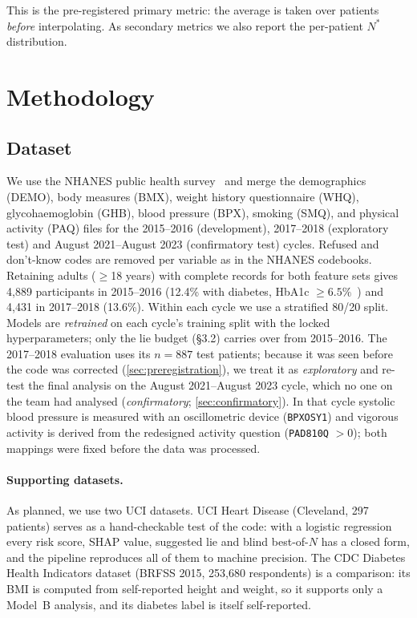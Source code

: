 \documentclass[sigconf,nonacm]{acmart}
\begin{document}
This is the pre-registered primary metric: the average is taken over
patients \emph{before} interpolating.  As secondary metrics we also
report the per-patient $N^*$ distribution.

\section{Methodology}

\subsection{Dataset}

We use the NHANES public health survey~\cite{johnson2014national} and
merge the demographics (DEMO), body measures (BMX), weight history
questionnaire (WHQ), glycohaemoglobin (GHB), blood pressure (BPX),
smoking (SMQ), and physical activity (PAQ) files for the 2015--2016
(development), 2017--2018 (exploratory test) and August
2021--August 2023 (confirmatory test) cycles.  Refused and
don't-know codes are removed per variable as in the NHANES codebooks.
Retaining adults ($\geq$18 years) with complete records for both
feature sets gives 4{,}889 participants in 2015--2016 (12.4\% with
diabetes, HbA1c $\geq 6.5\%$~\cite{ada2023standards}) and 4{,}431 in
2017--2018 (13.6\%).  Within each cycle we use a stratified 80/20
split.  Models are \emph{retrained} on each cycle's training split with
the locked hyperparameters; only the lie budget (\S3.2) carries over
from 2015--2016.  The 2017--2018 evaluation uses its $n=887$ test
patients; because it was seen before the code was corrected
(\cref{sec:preregistration}), we treat it as \emph{exploratory} and
re-test the final analysis on the August 2021--August 2023 cycle, which
no one on the team had analysed (\emph{confirmatory};
\cref{sec:confirmatory}).  In that cycle systolic blood pressure is
measured with an oscillometric device (\texttt{BPXOSY1}) and vigorous
activity is derived from the redesigned activity question
(\texttt{PAD810Q} $>0$); both mappings were fixed before the data was
processed.

\paragraph{Supporting datasets.}  As planned, we use two UCI datasets.
UCI Heart Disease (Cleveland, 297 patients) serves as a hand-checkable
test of the code: with a logistic regression every risk score, SHAP
value, suggested lie and blind best-of-$N$ has a closed form, and the
pipeline reproduces all of them to machine precision.  The CDC Diabetes
Health Indicators dataset (BRFSS 2015, 253{,}680 respondents) is a
comparison: its BMI is computed from self-reported height and weight,
so it supports only a Model~B analysis, and its diabetes label is
itself self-reported.
\end{document}

